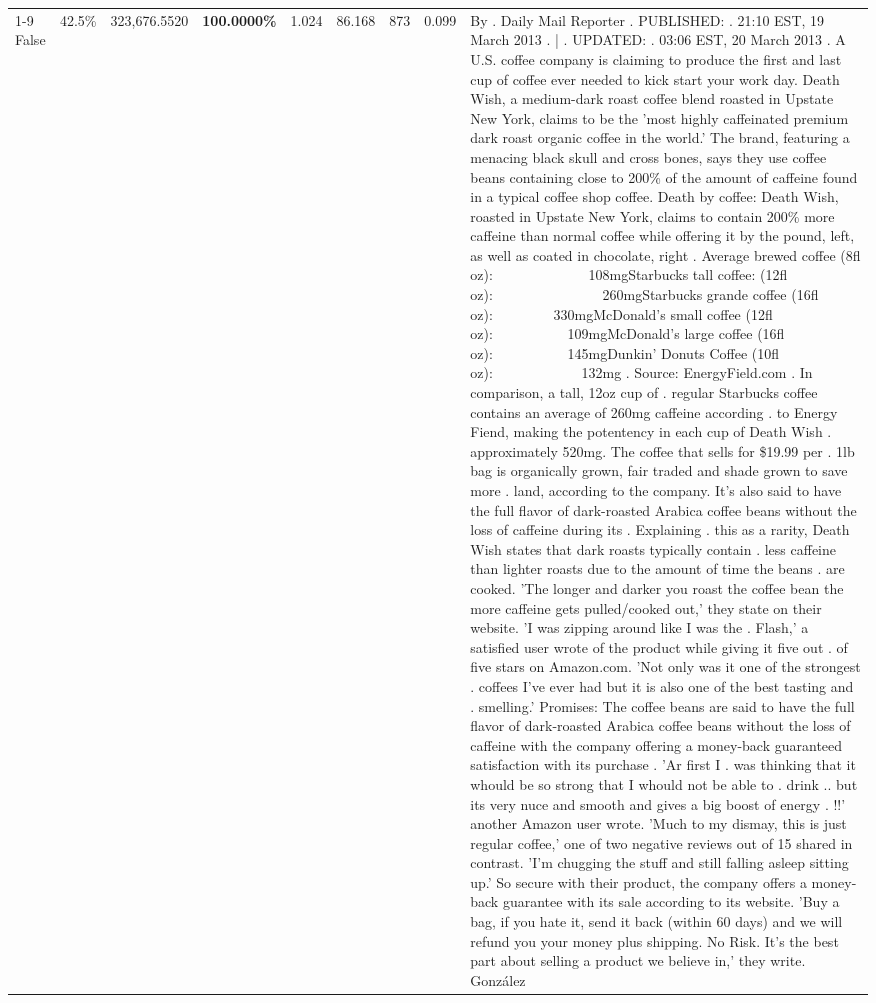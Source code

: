 \begin{table}[H]
{\begin{tabular}{lllrlllll}
\cline{1-9} \cline{2-9}
False & 42.5\% & 323,676.5520 & \bfseries \color{red} 100.0000\% & 1.024 & 86.168 & 873 & 0.099 & By . Daily Mail Reporter . PUBLISHED: . 21:10 EST, 19 March 2013 . | . UPDATED: . 03:06 EST, 20 March 2013 . A U.S. coffee company is claiming to produce the first and last cup of coffee ever needed to kick start your work day. Death Wish, a medium-dark roast coffee blend roasted in Upstate New York, claims to be the 'most highly caffeinated premium dark roast organic coffee in the world.' The brand, featuring a menacing black skull and cross bones, says they use coffee beans containing close to 200\% of the amount of caffeine found in a typical coffee shop coffee. Death by coffee: Death Wish, roasted in Upstate New York, claims to contain 200\% more caffeine than normal coffee while offering it by the pound, left, as well as coated in chocolate, right . Average brewed coffee (8fl oz):              108mgStarbucks tall coffee: (12fl oz):                260mgStarbucks grande coffee (16fl oz):         330mgMcDonald's small coffee (12fl oz):           109mgMcDonald's large coffee (16fl oz):           145mgDunkin' Donuts Coffee (10fl oz):             132mg . Source: EnergyField.com . In comparison, a tall, 12oz cup of . regular Starbucks coffee contains an average of 260mg caffeine according . to Energy Fiend, making the potentency in each cup of Death Wish . approximately 520mg. The coffee that sells for \$19.99 per . 1lb bag is organically grown, fair traded and shade grown to save more . land, according to the company. It's also said to have the full flavor of dark-roasted Arabica coffee beans without the loss of caffeine during its . Explaining . this as a rarity, Death Wish states that dark roasts typically contain . less caffeine than lighter roasts due to the amount of time the beans . are cooked. 'The longer and darker you roast the coffee bean the more caffeine gets pulled/cooked out,' they state on their website. 'I was zipping around like I was the . Flash,' a satisfied user wrote of the product while giving it five out . of five stars on Amazon.com. 'Not only was it one of the strongest . coffees I've ever had but it is also one of the best tasting and . smelling.’ Promises: The coffee beans are said to have the full flavor of dark-roasted Arabica coffee beans without the loss of caffeine with the company offering a money-back guaranteed satisfaction with its purchase . 'Ar first I . was thinking that it whould be so strong that I whould not be able to . drink .. but its very nuce and smooth and gives a big boost of energy . !!' another Amazon user wrote. 'Much to my dismay, this is just regular coffee,' one of two negative reviews out of 15 shared in contrast. 'I'm chugging the stuff and still falling asleep sitting up.' So secure with their product, the company offers a money-back guarantee with its sale according to its website. 'Buy a bag, if you hate it, send it back (within 60 days) and we will refund you your money plus shipping. No Risk. It’s the best part about selling a product we believe in,' they write. González \\

\end{tabular}}
\end{table}
